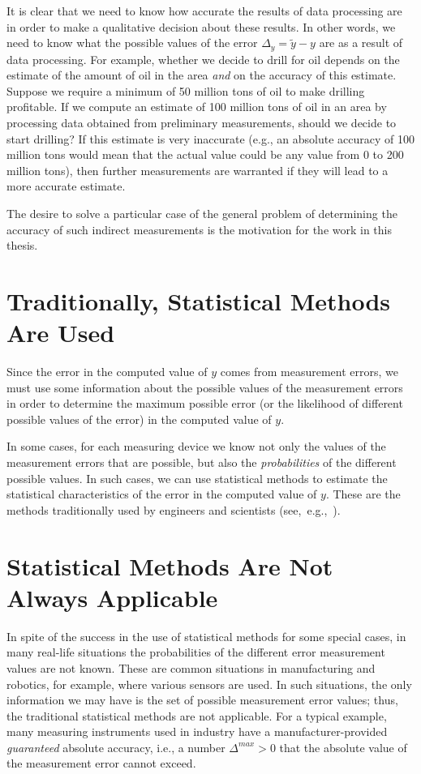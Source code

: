 It is clear that we need to know how accurate the results of data processing
are in order to make a qualitative decision about these results.  In other
words, we need to know what the possible values of the error
$\Delta_y=\tilde y-y$ are as a result of data processing.
For example, whether we decide to drill for oil depends on the estimate of
the amount of oil in the area {\em and\/} on the accuracy of this estimate.
Suppose we require a minimum of 50 million tons of oil to make drilling
profitable.  If we compute an estimate of 100 million tons of oil in an
area by processing data obtained from preliminary measurements, should we 
decide to start drilling?  If this estimate is very inaccurate (e.g., an
absolute accuracy of 100 million tons would mean that the actual value could
be any value from 0 to 200 million tons), then further measurements are
warranted if they will lead to a more accurate estimate.

The desire to solve a particular case of the general problem of determining
the accuracy of such indirect measurements is the motivation for the work in
this thesis.

\section{Traditionally, Statistical Methods Are Used}

Since the error in the computed value of $y$ comes from measurement
errors, we must use some information about the possible values of the
measurement errors in order to determine the maximum possible error (or the
likelihood of different possible values of the error) in the computed value
of $y$.

In some cases, for each measuring device we know not only the values of the
measurement errors that are possible, but also the {\em probabilities\/} of
the different possible values. In such cases, we can use statistical methods
to estimate the statistical characteristics of the error in the computed value
of $y$. These are the methods traditionally used by
engineers and scientists (see,~e.g.,~\cite{Rabinovich1995}).

\section{Statistical Methods Are Not Always Applicable}

In spite of the success in the use of statistical methods for some special
cases, in many real-life situations the probabilities of the different error
measurement values are not known. These are common situations in manufacturing
and robotics, for example, where various sensors are used. In such situations, 
the only information we may have is the set of possible measurement error 
values; thus, the traditional statistical methods are not applicable.
For a typical example, many measuring instruments used in industry have a
manufacturer-provided {\em guaranteed\/} absolute accuracy, i.e., a number
$\Delta^{max}>0$ that the absolute value of the measurement error cannot
exceed.

